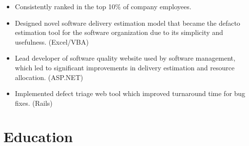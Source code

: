 \documentclass[11pt,a4paper,roman]{moderncv}
\begin{document}
\begin{itemize}
\item Consistently ranked in the top 10\% of company employees.
\item Designed novel software delivery estimation model that became the defacto estimation tool for the software organization due to its simplicity and usefulness. (Excel/VBA)
\item Lead developer of software quality website used by software management, which led to significant improvements in delivery estimation and resource allocation. (ASP.NET)
\item Implemented defect triage web tool which improved turnaround time for bug fixes. (Rails)
\end{itemize}

\section{Education}
\end{document}
